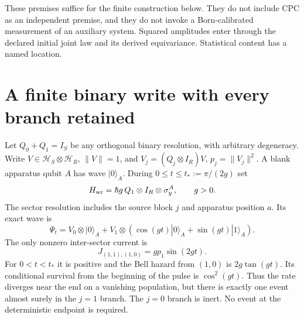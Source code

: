 \documentclass[11pt,oneside,openany]{book}
\theoremstyle{definition}
\theoremstyle{remark}\newtheorem{remark}[theorem]{Remark}
\begin{document}
These premises suffice for the finite construction below. They do not include CPC as an independent premise, and they do not invoke a Born-calibrated measurement of an auxiliary system. Squared amplitudes enter through the declared initial joint law and its derived equivariance. Statistical content has a named location.

\section{A finite binary write with every branch retained}
Let $Q_0+Q_1=I_S$ be any orthogonal binary resolution, with arbitrary degeneracy. Write $V\in\mathcal H_S\otimes\mathcal H_R$, $\|V\|=1$, and $V_j=(Q_j\otimes I_R)V$, $p_j=\|V_j\|^2$. A blank apparatus qubit $A$ has wave $|0\rangle_A$. During $0\le t\le t_*:=\pi/(2g)$ set
\begin{equation}\label{int:writeH}
 H_{\rm wr}=\hbar g\,Q_1\otimes I_R\otimes\sigma_y^A,
 \qquad g>0.
\end{equation}
The sector resolution includes the source block $j$ and apparatus position $a$. Its exact wave is
\begin{equation}\label{int:writewave}
 \Psi_t=V_0\otimes|0\rangle_A+
 V_1\otimes(\cos(gt)|0\rangle_A+\sin(gt)|1\rangle_A).
\end{equation}
The only nonzero inter-sector current is
\[
 J_{(1,1),(1,0)}=g p_1\sin(2gt).
\]
For $0<t<t_*$ it is positive and the Bell hazard from $(1,0)$ is $2g\tan(gt)$. Its conditional survival from the beginning of the pulse is $\cos^2(gt)$. Thus the rate diverges near the end on a vanishing population, but there is exactly one event almost surely in the $j=1$ branch. The $j=0$ branch is inert. No event at the deterministic endpoint is required.
\end{document}
